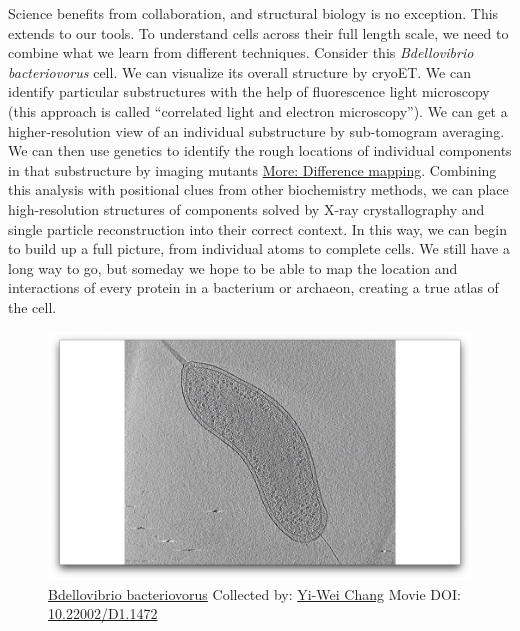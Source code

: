 \documentclass[]{tufte-book}
\begin{document}
Science benefits from collaboration, and structural biology is no
exception. This extends to our tools. To understand cells across their
full length scale, we need to combine what we learn from different
techniques. Consider this \emph{Bdellovibrio bacteriovorus} cell. We can
visualize its overall structure by cryoET. We can identify particular
substructures with the help of fluorescence light microscopy (this
approach is called ``correlated light and electron microscopy''). We can
get a higher-resolution view of an individual substructure by
sub-tomogram averaging. We can then use genetics to identify the rough
locations of individual components in that substructure by imaging
mutants \protect\hyperlink{Difference_mapping}{More: Difference
mapping}. Combining this analysis with positional clues from other
biochemistry methods, we can place high-resolution structures of
components solved by X-ray crystallography and single particle
reconstruction into their correct context. In this way, we can begin to
build up a full picture, from individual atoms to complete cells. We
still have a long way to go, but someday we hope to be able to map the
location and interactions of every protein in a bacterium or archaeon,
creating a true atlas of the cell.





\begin{figure}
\includegraphics{movie_stills/1_10} \caption[\protect\hyperlink{tree}{Bdellovibrio bacteriovorus}
Collected by: \protect\hyperlink{yi-wei_chang}{Yi-Wei Chang} Movie DOI:
\href{https://doi.org/10.22002/D1.1472}{10.22002/D1.1472}]{\protect\hyperlink{tree}{Bdellovibrio bacteriovorus}
Collected by: \protect\hyperlink{yi-wei_chang}{Yi-Wei Chang} Movie DOI:
\href{https://doi.org/10.22002/D1.1472}{10.22002/D1.1472}}\label{fig:1-10}
\end{figure}
\end{document}
